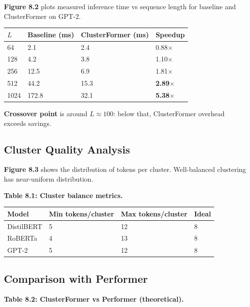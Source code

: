 \textbf{Figure 8.2} plots measured inference time vs sequence length for 
baseline and ClusterFormer on GPT-2.

\begin{table}[H]
\centering
\small
\begin{tabular}{llll}
\toprule
\textbf{$L$} & \textbf{Baseline (ms)} & \textbf{ClusterFormer (ms)} & \textbf{Speedup} \\
\midrule
64 & 2.1 & 2.4 & 0.88$\times$ \\
128 & 4.2 & 3.8 & 1.10$\times$ \\
256 & 12.5 & 6.9 & 1.81$\times$ \\
512 & 44.2 & 15.3 & \textbf{2.89$\times$} \\
1024 & 172.8 & 32.1 & \textbf{5.38$\times$} \\
\bottomrule
\end{tabular}
\end{table}

\textbf{Crossover point} is around $L \approx 100$: below that, ClusterFormer 
overhead exceeds savings.

\subsection{Cluster Quality Analysis}

\textbf{Figure 8.3} shows the distribution of tokens per cluster. Well-balanced 
clustering has near-uniform distribution.

\textbf{Table 8.1: Cluster balance metrics.}

\begin{table}[H]
\centering
\small
\begin{tabular}{llll}
\toprule
\textbf{Model} & \textbf{Min tokens/cluster} & \textbf{Max tokens/cluster} & \textbf{Ideal} \\
\midrule
DistilBERT & 5 & 12 & 8 \\
RoBERTa & 4 & 13 & 8 \\
GPT-2 & 5 & 12 & 8 \\
\bottomrule
\end{tabular}
\end{table}

\subsection{Comparison with Performer}

\textbf{Table 8.2: ClusterFormer vs Performer (theoretical).}

